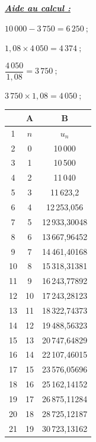 \begin{enumerate}
\begin{minipage}[t]{0.6\textwidth}
\underline{\textit{\textbf{Aide au calcul :}}}

$10\,000 - 3\,750 = 6\,250~;$

\smallskip

$1,08 \times 4\,050 = 4\,374~;$

\smallskip

$\dfrac{4\,050}{1,08} = 3\,750~;$

\smallskip

$3\,750 \times 1,08 = 4\,050~;$
\end{minipage}
\hfill
\begin{minipage}[t]{0.35\textwidth}
\vspace{0pt}
\begin{center}
\begin{tabular}{|c|c|c|}
\hline
\rowcolor{gray!20}
 & A & B \\
\hline
\cellcolor{gray!20}1 & $n$ & $u_n$ \\
\hline
\cellcolor{gray!20}2 & 0 & 10\,000 \\
\hline
\cellcolor{gray!20}3 & 1 & 10\,500 \\
\hline
\cellcolor{gray!20}4 & 2 & 11\,040 \\
\hline
\cellcolor{gray!20}5 & 3 & 11\,623,2 \\
\hline
\cellcolor{gray!20}6 & 4 & 12\,253,056 \\
\hline
\cellcolor{gray!20}7 & 5 & 12\,933,30048 \\
\hline
\cellcolor{gray!20}8 & 6 & 13\,667,96452 \\
\hline
\cellcolor{gray!20}9 & 7 & 14\,461,40168 \\
\hline
\cellcolor{gray!20}10 & 8 & 15\,318,31381 \\
\hline
\cellcolor{gray!20}11 & 9 & 16\,243,77892 \\
\hline
\cellcolor{gray!20}12 & 10 & 17\,243,28123 \\
\hline
\cellcolor{gray!20}13 & 11 & 18\,322,74373 \\
\hline
\cellcolor{gray!20}14 & 12 & 19\,488,56323 \\
\hline
\cellcolor{gray!20}15 & 13 & 20\,747,64829 \\
\hline
\cellcolor{gray!20}16 & 14 & 22\,107,46015 \\
\hline
\cellcolor{gray!20}17 & 15 & 23\,576,05696 \\
\hline
\cellcolor{gray!20}18 & 16 & 25\,162,14152 \\
\hline
\cellcolor{gray!20}19 & 17 & 26\,875,11284 \\
\hline
\cellcolor{gray!20}20 & 18 & 28\,725,12187 \\
\hline
\cellcolor{gray!20}21 & 19 & 30\,723,13162 \\
\hline
\end{tabular}
\end{center}
\end{minipage}
\end{enumerate}
